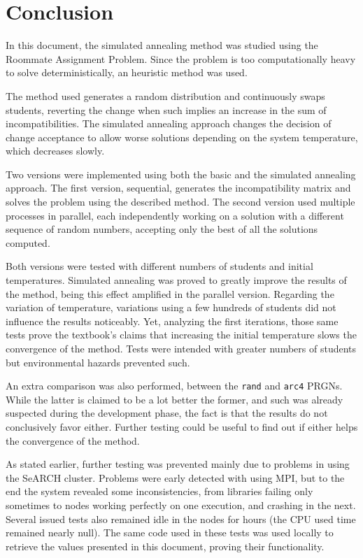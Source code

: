 \section{Conclusion}
\label{sec:conclusion}

In this document, the simulated annealing method was studied using the Roommate Assignment Problem. Since the problem is too computationally heavy to solve deterministically, an heuristic method was used.

The method used generates a random distribution and continuously swaps students, reverting the change when such implies an increase in the sum of incompatibilities. The simulated annealing approach changes the decision of change acceptance to allow worse solutions depending on the system temperature, which decreases slowly.

Two versions were implemented using both the basic and the simulated annealing approach. The first version, sequential, generates the incompatibility matrix and solves the problem using the described method. The second version used multiple processes in parallel, each independently working on a solution with a different sequence of random numbers, accepting only the best of all the solutions computed.

Both versions were tested with different numbers of students and initial temperatures. Simulated annealing was proved to greatly improve the results of the method, being this effect amplified in the parallel version. Regarding the variation of temperature, variations using a few hundreds of students did not influence the results noticeably. Yet, analyzing the first iterations, those same tests prove the textbook's claims that increasing the initial temperature slows the convergence of the method. Tests were intended with greater numbers of students but environmental hazards prevented such.

An extra comparison was also performed, between the \texttt{rand} and \texttt{arc4} PRGNs. While the latter is claimed to be a lot better the former, and such was already suspected during the development phase, the fact is that the results do not conclusively favor either. Further testing could be useful to find out if either helps the convergence of the method.

As stated earlier, further testing was prevented mainly due to problems in using the SeARCH cluster. Problems were early detected with using MPI, but to the end the system revealed some inconsistencies, from libraries failing only sometimes to nodes working perfectly on one execution, and crashing in the next. Several issued tests also remained idle in the nodes for hours (the CPU used time remained nearly null). The same code used in these tests was used locally to retrieve the values presented in this document, proving their functionality.